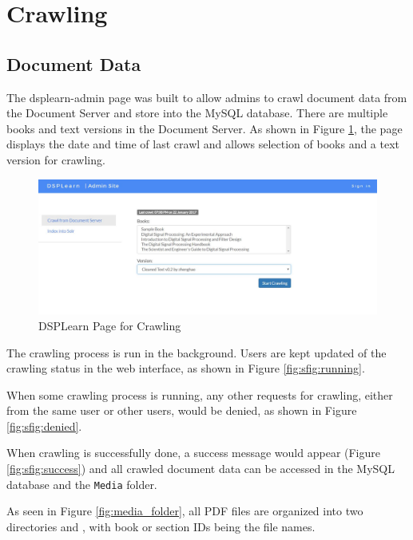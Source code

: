 \section{Crawling}
\subsection{Document Data}
The dsplearn-admin page was built to allow admins to crawl document data from the Document Server and store into the MySQL database. There are multiple books and text versions in the Document Server. As shown in Figure \ref{fig:dsplearn_admin}, the page displays the date and time of last crawl and allows selection of books and a text version for crawling. 

\begin{figure}[!htbp]
  \includegraphics[width=\textwidth]{system_demonstration/demo_dsplearn_admin.jpg}
  \caption{DSPLearn Page for Crawling}
  \label{fig:dsplearn_admin}
\end{figure}

The crawling process is run in the background. Users are kept updated of the crawling status in the web interface, as shown in Figure \ref{fig:sfig:running}.

When some crawling process is running, any other requests for crawling, either from the same user or other users, would be denied, as shown in Figure \ref{fig:sfig:denied}.

When crawling is successfully done, a success message would appear (Figure \ref{fig:sfig:success}) and all crawled document data can be accessed in the MySQL database and the \texttt{Media} folder.

As seen in Figure \ref{fig:media_folder}, all PDF files are organized into two directories  and , with book or section IDs being the file names.


